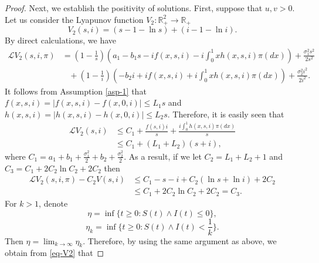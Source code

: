 \documentclass[12pt]{amsart}
\theoremstyle{remark}
\numberwithin{equation}{section}
\newcommand{\N}{\mathbb{N}}
\newcommand{\R}{\mathbb{R}}
\newcommand{\Lom}{\mathcal{L}}
\newcommand{\abs}[1]{\left\vert#1\right\vert}
\numberwithin{equation}{section}
\newcommand{\1}{\boldsymbol{1}}
\def\hat{\widehat}
\begin{document}
\begin{proof}
Next, we establish the positivity of solutions. First, suppose that $u,v>0$.
Let us consider  the Lyapunov function $V_2: \R_+^{2}\rightarrow \R_+$
$$V_2(s,i)=\left(s-1-\ln s\right)+(i-1-\ln i).
$$
By direct calculations, we have
\begin{equation*}
\begin{aligned}
\Lom V_2(s,i,\pi)&=\left(1-\frac {1}{s}\right)\left(a_1-b_1s-if(x,s,i)-i\int_0^1xh(x,s,i)\pi(dx)\right)+ \frac {\sigma_1^2s^2}{2s^2}
\\
&\;\;\;+\left(1-\frac 1{i}\right)\left(-b_2i+if(x,s,i)+i\int_0^1xh(x,s,i)\pi(dx)\right) +\frac {\sigma_2^2i^2}{2i^2}.
\end{aligned}
\end{equation*}
It follows from Assumption \ref{asp-1} that
$f(x,s,i)=\abs{f(x,s,i)-f(x,0,i)}\leq L_1s$ and
$h(x,s,i)=\abs{h(x,s,i)-h(x,0,i)}\leq L_2s$.
Therefore, it is easily seen that
\begin{equation*}
\begin{aligned}
\Lom V_2(s,i)
&\leq C_1+\frac{f(s,i)i}{s} +\frac{i\int_0^1 h(x,s,i)\pi(dx)}s
\\&\leq C_1+(L_1+L_2)(s+i),
\end{aligned}
\end{equation*}
where $C_1= a_1+ b_1+\frac{\sigma_1^2}2+b_2+\frac{\sigma_2^2}2.$
As a result, if we let $C_2=L_1+L_2+1$ and $C_3=C_1+2C_2\ln C_2+2C_2$ then
\begin{equation}\label{eq-V2}
\begin{aligned}
\Lom V_2(s,i,\pi)-C_2V(s,i)&\leq C_1-s-i+C_2(\ln s+\ln i)+2C_2\\
&\leq C_1+2C_2\ln C_2+2C_2=C_3.
\end{aligned}
\end{equation}
For $k>1$, denote
$$\eta=\inf\big\{t\geq 0: S(t)\wedge I(t)\leq 0\big\},$$
$$\eta_k=\inf\Big\{t\geq 0: S(t)\wedge I(t)<\dfrac 1k\Big\}.$$
Then $\eta=\lim_{k\to\infty}\eta_k$.
Therefore, by using the same argument as above, we obtain from \eqref{eq-V2} that

\end{proof}
\end{document}
